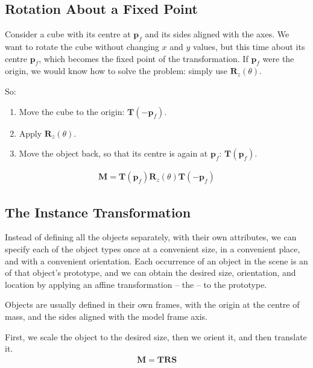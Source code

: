 \documentclass[../COS3712_Notes.tex]{subfiles}
\begin{document}
      \subsection{Rotation About a Fixed Point}
        \begin{example}
          Consider a cube with its centre at $\mathbf{p}_f$ and its sides aligned with the axes.
          We want to rotate the cube without changing $x$ and $y$ values,
          but this time about its centre $\mathbf{p}_f$, which becomes the fixed point
          of the transformation.
          If $\mathbf{p}_f$ were the origin, we would know how to solve the problem:
          simply use $\mathbf{R}_z(\theta)$.

          So:
          \begin{enumerate}[nosep]
            \item Move the cube to the origin: $\mathbf{T}(-\mathbf{p}_f)$.
            \item Apply $\mathbf{R}_z(\theta)$.
            \item Move the object back, so that its centre is again at $\mathbf{p}_f$:
              $\mathbf{T}(\mathbf{p}_f)$.
          \end{enumerate}
          \begin{align*}
            \mathbf{M} = \mathbf{T}(\mathbf{p}_f)\mathbf{R}_z(\theta)\mathbf{T}(-\mathbf{p}_f)
          \end{align*}
        \end{example}

      \subsection{The Instance Transformation}
        Instead of defining all the objects separately, with their own attributes,
        we can specify each of the object types once at a convenient size, in a convenient
        place, and with a convenient orientation.
        Each occurrence of an object in the scene is an  of that object's
        prototype, and we can obtain the desired size, orientation, and location
        by applying an affine transformation -- the  --
        to the prototype.

        Objects are usually defined in their own frames, with the origin at the centre of mass,
        and the sides aligned with the model frame axis.

        First, we scale the object to the desired size, then we orient it, and then translate it.
        \begin{align*}
          \mathbf{M} = \mathbf{TRS}
        \end{align*}
\end{document}
